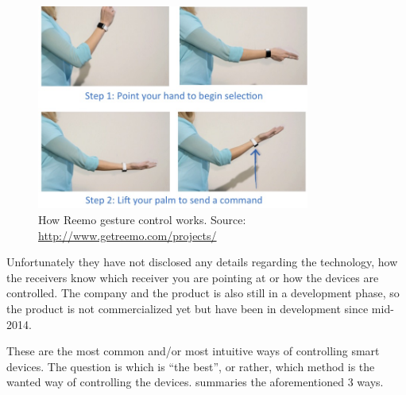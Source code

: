 \begin{figure}[!htb]
    \centering
    \includegraphics[width=0.8\textwidth]{images/Reemo}
    \caption{How Reemo gesture control works. Source: \url{http://www.getreemo.com/projects/}}
    \label{fig:reemo}
\end{figure}

Unfortunately they have not disclosed any details regarding the technology, 
how the receivers know which receiver you are pointing at or how the devices are controlled. 
The company and the product is also still in a development phase, 
so the product is not commercialized yet but have been in development since mid-2014.

These are the most common and/or most intuitive ways of controlling smart devices. 
The question is which is ``the best'', or rather, which method is the wanted way of controlling the devices.
 summaries the aforementioned 3 ways. 

